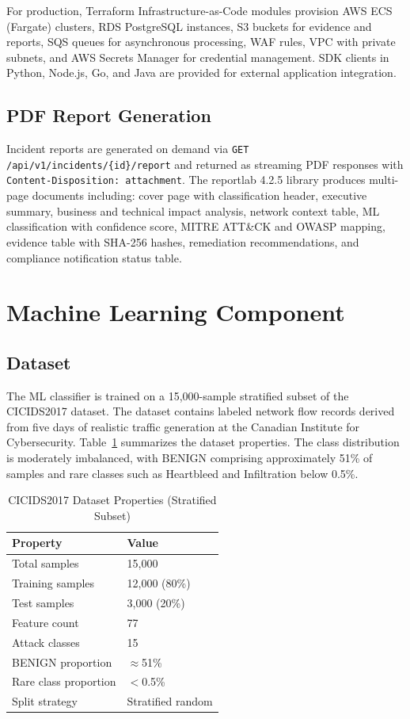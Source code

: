 \documentclass[conference]{IEEEtran}
\begin{document}
For production, Terraform Infrastructure-as-Code modules provision AWS ECS (Fargate) clusters, RDS PostgreSQL instances, S3 buckets for evidence and reports, SQS queues for asynchronous processing, WAF rules, VPC with private subnets, and AWS Secrets Manager for credential management. SDK clients in Python, Node.js, Go, and Java are provided for external application integration.

\subsection{PDF Report Generation}

Incident reports are generated on demand via \texttt{GET /api/v1/incidents/\{id\}/report} and returned as streaming PDF responses with \texttt{Content-Disposition: attachment}. The reportlab 4.2.5 library produces multi-page documents including: cover page with classification header, executive summary, business and technical impact analysis, network context table, ML classification with confidence score, MITRE ATT\&CK and OWASP mapping, evidence table with SHA-256 hashes, remediation recommendations, and compliance notification status table.

\section{Machine Learning Component}

\subsection{Dataset}

The ML classifier is trained on a 15,000-sample stratified subset of the CICIDS2017 \cite{sharafaldin2018cicids} dataset. The dataset contains labeled network flow records derived from five days of realistic traffic generation at the Canadian Institute for Cybersecurity. Table~\ref{tab:dataset} summarizes the dataset properties. The class distribution is moderately imbalanced, with BENIGN comprising approximately 51\% of samples and rare classes such as Heartbleed and Infiltration below 0.5\%.

\begin{table}[h]
\caption{CICIDS2017 Dataset Properties (Stratified Subset)}
\label{tab:dataset}
\centering
\begin{tabular}{@{}ll@{}}
\toprule
\textbf{Property} & \textbf{Value} \\
\midrule
Total samples & 15,000 \\
Training samples & 12,000 (80\%) \\
Test samples & 3,000 (20\%) \\
Feature count & 77 \\
Attack classes & 15 \\
BENIGN proportion & $\approx$51\% \\
Rare class proportion & $<$0.5\% \\
Split strategy & Stratified random \\
\bottomrule
\end{tabular}
\end{table}
\end{document}

